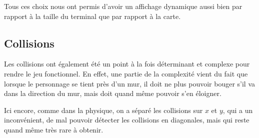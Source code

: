 \documentclass[12pt]{article}
\begin{document}
		
		Tous ces choix nous ont permis d'avoir un affichage dynamique aussi bien par rapport à la taille du terminal que par rapport à la carte.
		\newpage

		\subsection{Collisions}
		
		Les collisions ont également été un point à la fois déterminant et complexe pour rendre le jeu fonctionnel. En effet, une partie de la complexité vient du fait que lorsque le personnage se tient près d'un mur, il doit ne plus pouvoir bouger s'il va dans la direction du mur, mais doit quand même pouvoir s'en éloigner.
		
		Ici encore, comme dans la physique, on a séparé les collisions sur \(x\) et \(y\), qui a un inconvénient, de mal pouvoir détecter les collisions en diagonales, mais qui reste quand même très rare à obtenir.
		
\end{document}
